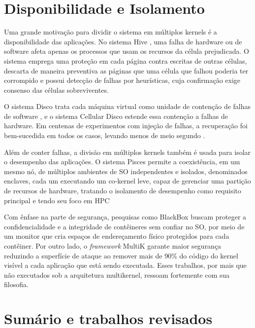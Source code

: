 \section{Disponibilidade e Isolamento}
\label{sec:rel-disponibilidade}

Uma grande motivação para dividir o sistema em múltiplos kernels é a disponibilidade das aplicações.
No sistema Hive \citep{chapin1995hive}, uma falha de hardware ou de software afeta apenas os processos que usam os recursos da célula prejudicada.
O sistema emprega uma proteção em cada página contra escritas de outras células, descarta de maneira preventiva as páginas que uma
célula que falhou poderia ter corrompido e possui detecção de falhas por heurísticas, cuja confirmação exige consenso das células sobreviventes.

O sistema Disco trata cada máquina virtual como unidade de contenção de falhas de software \citep{bugnion1997disco}, e o sistema Cellular Disco estende
essa contenção a falhas de hardware.
Em centenas de experimentos com injeção de falhas, a recuperação foi bem-sucedida em todos os casos, levando menos de meio segundo \citep{govil2000cellular}.

Além de conter falhas, a divisão em múltiplos kernels também é usada para isolar o desempenho das aplicações.
O sistema Pisces \citep{ouyang2015pisces} permite a coexistência, em um mesmo nó, de múltiplos ambientes de SO independentes e isolados,
denominados enclaves, cada um executando um co-kernel leve, capaz de gerenciar uma partição de recursos de hardware, tratando o
isolamento de desempenho como requisito principal e tendo seu foco em HPC

Com ênfase na parte de segurança, pesquisas como BlackBox \citep{vanthof2022blackbox} buscam proteger a confidencialidade e a
integridade de contêineres sem confiar no SO, por meio de um monitor que cria espaços de endereçamento físico protegidos
para cada contêiner.
Por outro lado, o \textit{framework} MultiK \citep{kuo2019multik} garante maior segurança reduzindo a superfície de ataque ao remover mais de 90\% do
código do kernel visível a cada aplicação que está sendo executada.
Esses trabalhos, por mais que não executados sob a arquitetura multikernel, ressoam fortemente com sua filosofia.


\section{Sumário e trabalhos revisados}\label{sec:sumario-e-trabalhos-revisados}

